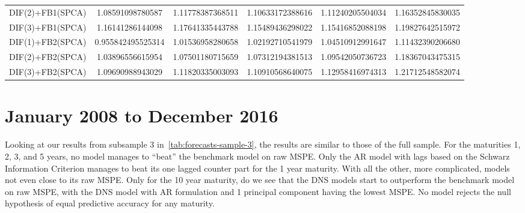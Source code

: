 \begin{table}[H]
\begin{adjustbox}{totalheight=\baselineskip}
\begin{tabular}{lSSSSS}
DIF(2)+FB1(SPCA) & 1.08591098780587 & 1.11778387368511 & 1.10633172388616 & 1.11240205504034 & 1.16352845830035 \\ 
DIF(3)+FB1(SPCA) & 1.16141286144098 & 1.17641335443788 & 1.15489436298022 & 1.15416852088198 & 1.19827642515972 \\ 
DIF(1)+FB2(SPCA) & 0.955842495525314 & 1.01536958280658 & 1.02192710541979 & 1.04510912991647 & 1.11432390206680 \\ 
DIF(2)+FB2(SPCA) & 1.03896556615954 & 1.07501180715659 & 1.07312194381513 & 1.09542050736723 & 1.18367043475315 \\ 
DIF(3)+FB2(SPCA) & 1.09690988943029 & 1.11820335003093 & 1.10910568640075 & 1.12958416974313 & 1.21712548582074 \\ \bottomrule 
\end{tabular}
\end{adjustbox}
\end{table}

\section{January 2008 to December 2016}
Looking at our results from subsample 3 in~\cref{tab:forecasts-sample-3}, the results are similar to those of the full sample. 
For the maturities 1, 2, 3, and 5 years, no model manages to \enquote{beat} the benchmark model on raw MSPE. 
Only the AR model with lags based on the Schwarz Information Criterion manages to beat its one lagged counter part for the 1 year maturity. 
With all the other, more complicated, models not even close to its raw MSPE. 
Only for the 10 year maturity, do we see that the DNS models start to outperform the benchmark model on raw MSPE, with the DNS model with AR formulation and 1 principal component having the lowest MSPE.
No model rejects the null hypothesis of equal predictive accuracy for any maturity. 

